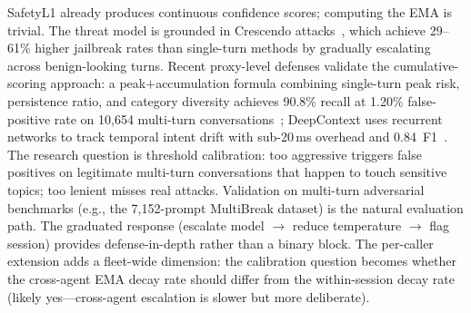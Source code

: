 \begin{opportunity}
\begin{frisk}
SafetyL1 already produces continuous confidence scores; computing
the EMA is trivial.  The threat model is grounded in Crescendo
attacks~\cite{crescendo2024}, which achieve 29--61\% higher
jailbreak rates than single-turn methods by gradually escalating
across benign-looking turns.  Recent proxy-level defenses validate
the cumulative-scoring approach: a peak$+$accumulation formula
combining single-turn peak risk, persistence ratio, and category
diversity achieves 90.8\% recall at 1.20\% false-positive rate on
10,654 multi-turn conversations~\cite{peakaccum2026}; DeepContext
uses recurrent networks to track temporal intent drift with sub-20\,ms
overhead and 0.84~F1~\cite{deepcontext2026}.  The research question
is threshold calibration: too aggressive triggers false positives on
legitimate multi-turn conversations that happen to touch sensitive
topics; too lenient misses real attacks.  Validation on multi-turn
adversarial benchmarks (e.g., the 7,152-prompt MultiBreak dataset)
is the natural evaluation path.  The graduated response
(escalate model $\to$ reduce temperature $\to$ flag session)
provides defense-in-depth rather than a binary block.  The per-caller
extension adds a fleet-wide dimension: the calibration question
becomes whether the cross-agent EMA decay rate should differ from
the within-session decay rate (likely yes---cross-agent escalation
is slower but more deliberate).
\end{frisk}
\end{opportunity}

